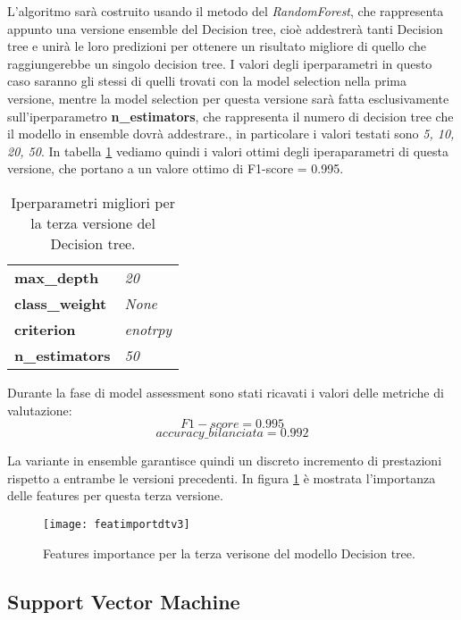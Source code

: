 L'algoritmo sarà costruito usando il metodo del \textit{RandomForest}, che rappresenta appunto una versione ensemble del Decision tree, cioè addestrerà tanti Decision tree e unirà le loro predizioni per ottenere un risultato migliore di quello che raggiungerebbe un singolo decision tree. I valori degli iperparametri in questo caso saranno gli stessi di quelli trovati con la model selection nella prima versione, mentre la model selection per questa versione sarà fatta esclusivamente sull'iperparametro \textbf{n\_estimators}, che rappresenta il numero di decision tree che il modello in ensemble dovrà addestrare., in particolare i valori testati sono \textit{5, 10, 20, 50}. In tabella \ref{tab:dtv3} vediamo quindi i valori ottimi degli iperaparametri di questa versione, che portano a un valore ottimo di F1-score = 0.995.

\begin{table}[h] 
\centering
\begin{tabular}{l l}
\hline
\textbf{max\_depth} & \textit{20}\\
\textbf{class\_weight} & \textit{None}\\
\textbf{criterion} & \textit{enotrpy}\\
\textbf{n\_estimators} & \textit{50}\\
\hline
\end{tabular}
\caption{Iperparametri migliori per la terza versione del Decision tree.}
\label{tab:dtv3}
\end{table}

Durante la fase di model assessment sono stati ricavati i valori delle metriche di valutazione:
$$F1-score = 0.995$$
$$accuracy\_bilanciata = 0.992$$

La variante in ensemble garantisce quindi un discreto incremento di prestazioni rispetto a entrambe le versioni precedenti. In figura \ref{fig:featuresimportancedtv3} è mostrata l'importanza delle features per questa terza versione.

\begin{figure}[h]
    \centering\texttt{[image: featimportdtv3]}
    \caption{Features importance per la terza verisone del modello Decision tree.}
    \label{fig:featuresimportancedtv3}
\end{figure}

\subsection{Support Vector Machine}
